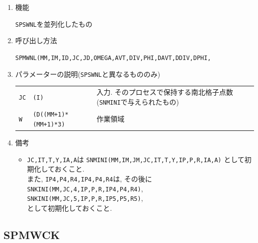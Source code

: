 \begin{enumerate}

\item 機能

{\tt SPSWNL}を並列化したもの

\item 呼び出し方法

{\tt SPMWNL(MM,IM,ID,JC,JD,OMEGA,AVT,DIV,PHI,DAVT,DDIV,DPHI,}\\
\hspace*{10em}{\tt RN,IT,T,Y,IP4,P4,R4,IP5,P5,R5,IA,A,Q,WS,WW,W)}
  
\item パラメーターの説明({\tt SPSWNL}と異なるもののみ)

\begin{tabular}{lll}
{\tt JC} & {\tt (I)} & 入力. そのプロセスで保持する南北格子点数
                        ({\tt SNMINI}で与えられたもの)\\
{\tt W}  & {\tt (D((MM+1)*(MM+1)*3)} & 作業領域
\end{tabular}

\item 備考

\begin{itemize}

\item {\tt JC,IT,T,Y,IA,A}は 
      {\tt SNMINI(MM,IM,JM,JC,IT,T,Y,IP,P,R,IA,A)} として初期化しておくこと.\\
       また, {\tt IP4,P4,R4,IP4,P4,R4}は, その後に\\
      {\tt SNKINI(MM,JC,4,IP,P,R,IP4,P4,R4)},
      {\tt SNKINI(MM,JC,5,IP,P,R,IP5,P5,R5)}, \\
      として初期化しておくこと.

 \end{itemize}

\end{enumerate}


\subsection{SPMWCK}

